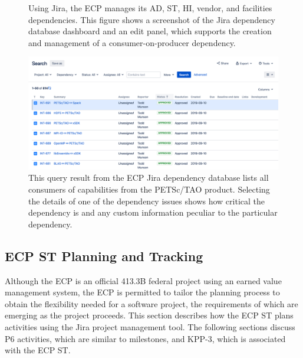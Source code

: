 \begin{figure}
	\centering
	\caption{Using Jira, the ECP manages its AD, ST, HI, vendor, and facilities dependencies.  This figure shows a screenshot of the Jira dependency database dashboard and an edit panel, which supports the creation and management of a consumer-on-producer dependency.}
	\label{fig:dependency-dashboard-edit}
\end{figure}

\begin{figure}
	\centering
	\includegraphics[width=0.9\linewidth]{PETSc-TAO-Dependencies}
	\caption{This query result from the ECP Jira dependency database lists all consumers of capabilities from the PETSc/TAO product. Selecting the details of one of the dependency issues shows how critical the dependency is and any custom information peculiar to the particular dependency.}
	\label{fig:petsc-tao-dependencies}
\end{figure}

\newpage
\subsection{ECP ST Planning and Tracking}

Although the ECP is an official 413.3B federal project using an earned value management system, the ECP is permitted to tailor the planning process to obtain the flexibility needed for a software project, the requirements of which are emerging as the project proceeds.  This section describes how the ECP ST plans activities using the Jira project management tool.  The following sections discuss P6 activities, which are similar to milestones, and KPP-3, which is associated with the ECP ST.


